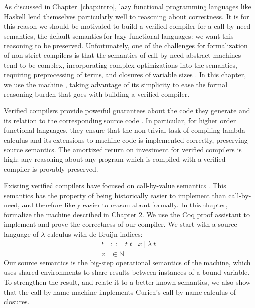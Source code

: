 \label{sec:introduction}
As discussed in Chapter~\ref{chap:intro}, lazy functional programming languages
like Haskell lend themselves particularly well to reasoning about correctness.
It is for this reason we should be motivated to build a verified compiler for a
call-by-need semantics, the default semantics for lazy functional languages: we
want this reasoning to be preserved.  Unfortunately, one of the challenges for
formalization of non-strict compilers is that the semantics of call-by-need
abstract machines tend to be complex, incorporating complex optimizations into
the semantics, requiring preprocessing of terms, and closures of variable sizes
\cite{jonesstg, TIM}.  In this chapter, we use the \ce machine \cite{cem},
taking advantage of its simplicity to ease the formal reasoning burden that goes
with building a verified compiler.

Verified compilers provide powerful guarantees about the code they generate and
its relation to the corresponding source code \cite{chlipala2007certified,
leroy2012compcert, cakeml14}.  In particular, for higher order functional
languages, they ensure that the non-trivial task of compiling lambda
calculus and its extensions to machine code is implemented correctly,
preserving source semantics. The amortized return on investment for verified
compilers is high: any reasoning about any program which is compiled with a
verified compiler is provably preserved. 

Existing verified compilers have focused on call-by-value semantics
\cite{chlipala2007certified, leroy2012compcert, cakeml14}. This semantics has
the property of being historically easier to implement than call-by-need, and
therefore likely easier to reason about formally. In this chapter, formalize the
\ce machine described in Chapter 2. We use the Coq proof assistant
\cite{barras1997coq} to implement and prove the correctness of our compiler. We
start with a source language of $\lambda$ calculus with de Bruijn indices:
\begin{align*}
 t &::= t \; t \; | \; x \; | \;  \lambda \; t \\
 x &\in \mathbb{N}
\end{align*}
Our source semantics is the big-step operational semantics of the \ce 
machine, which uses shared environments to share results between instances of a
bound variable. To strengthen the result, and relate it to a better-known
semantics, we also show that the call-by-name \ce machine implements
Curien's call-by-name calculus of closures. 

